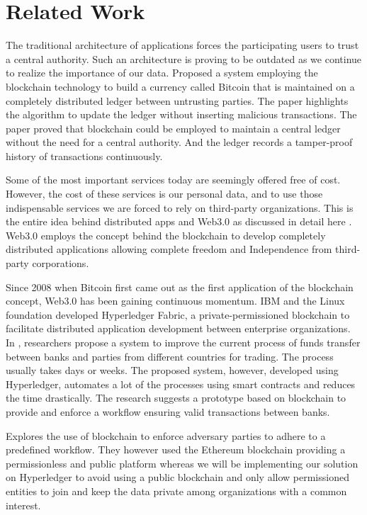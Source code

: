 
\chapter{Related Work}
\label{ch:related}
The traditional architecture of applications forces the participating users to trust a central authority. Such an architecture is proving to be outdated as we continue to realize the importance of our data. \cite{p2p-bitcoin} Proposed a system employing the blockchain technology to build a currency called Bitcoin that is maintained on a completely distributed ledger between untrusting parties. The paper highlights the algorithm to update the ledger without inserting malicious transactions. The paper proved that blockchain could be employed to maintain a central ledger without the need for a central authority. And the ledger records a tamper-proof history of transactions continuously.

\bigskip
Some of the most important services today are seemingly offered free of cost. However, the cost of these services is our personal data, and to use those indispensable services we are forced to rely on third-party organizations. This is the entire idea behind distributed apps and Web3.0 as discussed in detail here \cite{web3.0}. Web3.0 employs the concept behind the blockchain to develop completely distributed applications allowing complete freedom and Independence from third-party corporations.

\bigskip
Since 2008 when Bitcoin first came out as the first application of the blockchain concept, Web3.0 has been gaining continuous momentum. IBM and the Linux foundation developed \cite{ibm-hyperledger} Hyperledger Fabric, a private-permissioned blockchain to facilitate distributed application development between enterprise organizations. In \cite{x-org-workflow}, researchers propose a system to improve the current process of funds transfer between banks and parties from different countries for trading. The process usually takes days or weeks. The proposed system, however, developed using Hyperledger, automates a lot of the processes using smart contracts and reduces the time drastically. The research suggests a prototype based on blockchain to provide and enforce a workflow ensuring valid transactions between banks. 

\bigskip
\cite{collab-bw-adversaries} Explores the use of blockchain to enforce adversary parties to adhere to a predefined workflow. They however used the Ethereum blockchain providing a permissionless and public platform whereas we will be implementing our solution on Hyperledger to avoid using a public blockchain and only allow permissioned entities to join and keep the data private among organizations with a common interest.

